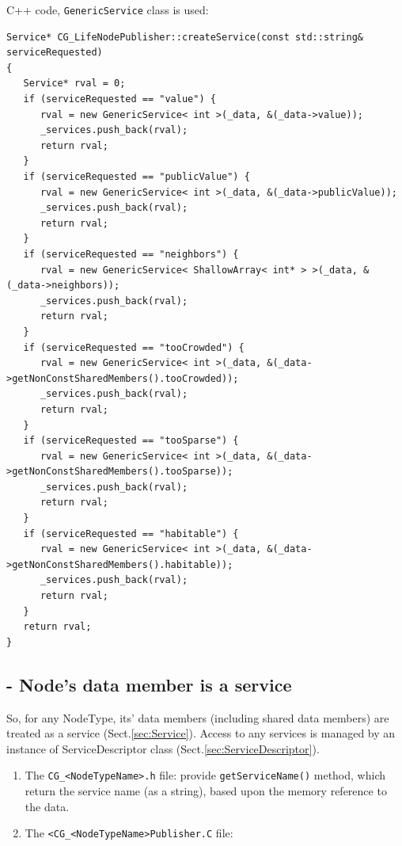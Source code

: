 C++ code, \verb!GenericService! class is used: 
\begin{lstlisting}
Service* CG_LifeNodePublisher::createService(const std::string& serviceRequested) 
{
   Service* rval = 0;
   if (serviceRequested == "value") {
      rval = new GenericService< int >(_data, &(_data->value));
      _services.push_back(rval);
      return rval;
   }
   if (serviceRequested == "publicValue") {
      rval = new GenericService< int >(_data, &(_data->publicValue));
      _services.push_back(rval);
      return rval;
   }
   if (serviceRequested == "neighbors") {
      rval = new GenericService< ShallowArray< int* > >(_data, &(_data->neighbors));
      _services.push_back(rval);
      return rval;
   }
   if (serviceRequested == "tooCrowded") {
      rval = new GenericService< int >(_data, &(_data->getNonConstSharedMembers().tooCrowded));
      _services.push_back(rval);
      return rval;
   }
   if (serviceRequested == "tooSparse") {
      rval = new GenericService< int >(_data, &(_data->getNonConstSharedMembers().tooSparse));
      _services.push_back(rval);
      return rval;
   }
   if (serviceRequested == "habitable") {
      rval = new GenericService< int >(_data, &(_data->getNonConstSharedMembers().habitable));
      _services.push_back(rval);
      return rval;
   }
   return rval;
}
\end{lstlisting}


% 


\subsection{- Node's data member is a service}
\label{sec:Node-data-member-as-a-service}

So, for any NodeType, its' data members (including shared data members) are
treated as a service (Sect.\ref{sec:Service}). Access to any services is managed
by an instance of ServiceDescriptor class (Sect.\ref{sec:ServiceDescriptor}).

\begin{enumerate}
  \item The \verb!CG_<NodeTypeName>.h! file: provide \verb!getServiceName()!
  method, which return the service name (as a string), based upon the memory
  reference to the data.

  \item The \verb!<CG_<NodeTypeName>Publisher.C! file: 
   
\end{enumerate}


